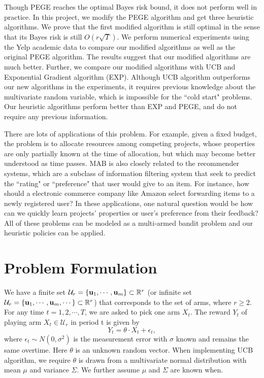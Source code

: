 \documentclass{article}
\theoremstyle{plain}
\theoremstyle{definition}
\begin{document}
Though PEGE reaches the optimal Bayes risk bound, it does not perform well in practice. In this project, we modify the PEGE algorithm and get three heuristic algorithms. We prove that the first modified algorithm is still optimal in the sense that its Bayes risk is still $O(r\sqrt{T})$. We perform numerical experiments using the Yelp academic data to compare our modified algorithms as well as the original PEGE algorithm. The results suggest that our modified algorithms are much better. Further, we compare our modified algorithms with UCB and Exponential Gradient algorithm (EXP). Although UCB algorithm outperforms our new algorithms in the experiments, it requires previous knowledge about the multivariate random variable, which is impossible for the ``cold start" problems. Our heuristic algorithms perform better than EXP and PEGE, and do not require any previous information.

There are lots of applications of this problem. For example, given a fixed budget, the problem is to allocate resources among competing projects, whose properties are only partially known at the time of allocation, but which may become better understood as time passes. MAB is also closely related to the recommender systems, which are a subclass of information filtering system that seek to predict the ``rating" or ``preference" that user would give to an item. For instance, how should a electronic commerce company like Amazon select forwarding items to a newly registered user? In these applications, one natural question would be how can we quickly learn projects' properties or user's preference from their feedback? All of these problems can be modeled as a multi-armed bandit problem and our heuristic policies can be applied.





\section{Problem Formulation}
We have a finite set $\mathcal{U}_{r}=\{\bold{u}_{1},\cdots,\bold{u}_{m}\}\subset \mathbb{R}^{r}$ (or infinite set $\mathcal{U}_{r}=\{\bold{u}_{1},\cdots,\bold{u}_{m},\cdots\}\subset \mathbb{R}^{r}$) that corresponds to the set of arms, where $r\geq 2$. For any time $t=1,2,\cdots,T$, we are asked to pick one arm $X_{t}$. The reward $Y_{t}$ of playing arm $X_{t}\in \mathcal{U}_{r}$ in period t is given by
\begin{equation}
Y_{t} = \theta \cdot X_{t} + \epsilon_{t}, \nonumber
\end{equation}
where $\epsilon_{t}\sim N(0,\sigma^{2})$ is the measurement error with $\sigma$ known and remains the same overtime. Here $\theta$ is an unknown random vector. When implementing UCB algorithm, we require $\theta$ is drawn from a multivariate normal distribution with mean $\mu$ and variance $\Sigma$. We further assume $\mu$ and $\Sigma$ are known when. 
\end{document}
